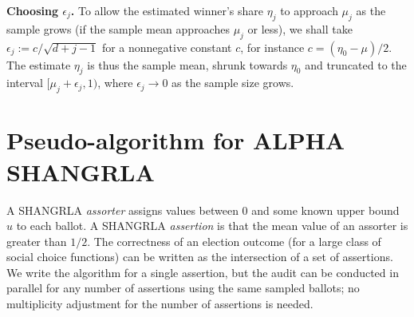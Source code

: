 \documentclass[12pt,runningheads]{llncs}
\begin{document}
{{\bf Choosing $\epsilon_j$.}
To allow the estimated winner's share $\eta_j$ to approach
$\mu_j$ as the sample grows (if the sample mean approaches $\mu_j$ or less),
we shall take $\epsilon_j := c/\sqrt{d+j-1}$ for a nonnegative constant $c$,
for instance $c=(\eta_0-\mu)/2$.
The estimate $\eta_j$ is thus the sample mean,
shrunk towards $\eta_0$ and truncated to the interval $[\mu_j + \epsilon_j, 1)$, where
$\epsilon_j \rightarrow 0$ as the sample size grows.

\section{Pseudo-algorithm for ALPHA SHANGRLA}

A SHANGRLA \emph{assorter} assigns values between $0$ and some known upper bound $u$ to
each ballot. 
A SHANGRLA \emph{assertion} is that the mean value of an assorter is greater than $1/2$.
The correctness of an election outcome (for a large class of social choice functions)
can be written as the intersection of a set of assertions.
We write the algorithm for a single assertion, but the audit can be conducted in parallel
for any number of assertions using the same sampled ballots; no multiplicity adjustment for the number
of assertions is needed.

}
\end{document}
